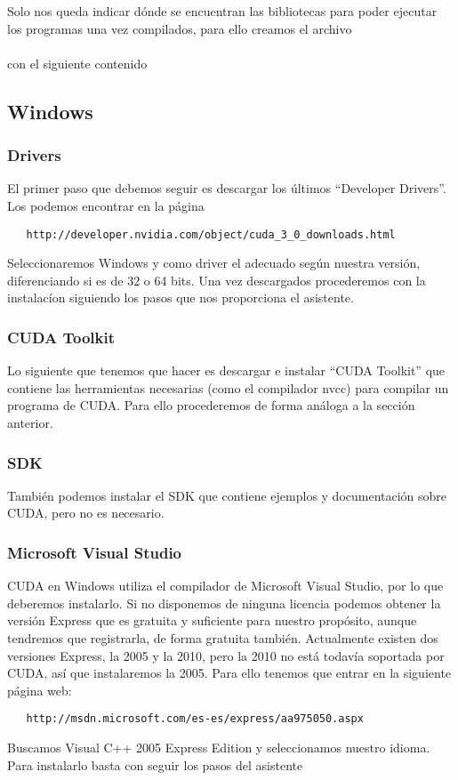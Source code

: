 Solo nos queda indicar dónde se encuentran las bibliotecas para poder ejecutar los programas una vez compilados,
para ello creamos el archivo\\
\\
con el siguiente contenido\\
\subsection{Windows}
\subsubsection{Drivers}
El primer paso que debemos seguir es descargar los últimos ``Developer Drivers''. Los podemos encontrar en la página
  \begin{verbatim}
   http://developer.nvidia.com/object/cuda_3_0_downloads.html
  \end{verbatim}
Seleccionaremos Windows y como driver el adecuado según nuestra
versión, diferenciando si es de 32 o 64 bits. Una vez descargados procederemos con la instalacíon siguiendo
los pasos que nos proporciona el asistente.
\subsubsection{CUDA Toolkit}
Lo siguiente que tenemos que hacer es descargar e instalar ``CUDA Toolkit'' que contiene las herramientas necesarias
(como el compilador nvcc) para compilar un programa de CUDA. Para ello procederemos de forma análoga a la sección anterior.
\subsubsection{SDK}
También podemos instalar el SDK que contiene ejemplos y documentación sobre CUDA, pero no es necesario.
\subsubsection{Microsoft Visual Studio}
CUDA en Windows utiliza el compilador  de Microsoft Visual Studio, por lo que deberemos instalarlo.
Si no disponemos de ninguna licencia podemos obtener la versión Express que es gratuita y suficiente para nuestro propósito,
aunque tendremos que registrarla, de forma gratuita también. Actualmente existen dos versiones Express, la 2005 y la 2010,
pero la 2010 no está todavía soportada por CUDA, así que instalaremos la 2005. Para ello tenemos que entrar en la
siguiente página web:
  \begin{verbatim}
   http://msdn.microsoft.com/es-es/express/aa975050.aspx
  \end{verbatim}
Buscamos Visual C++ 2005 Express Edition y seleccionamos nuestro idioma. Para instalarlo basta con seguir los pasos
del asistente

